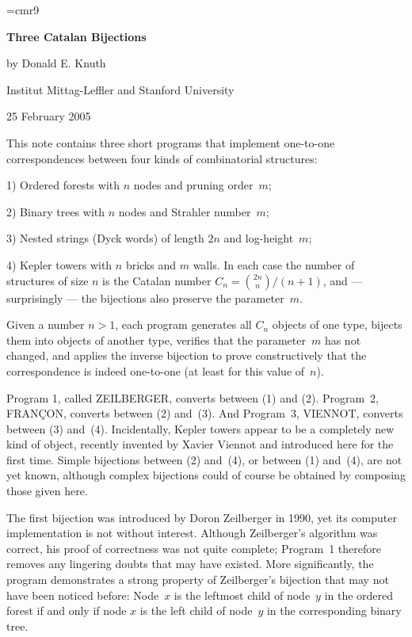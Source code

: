 
\font\mc=cmr9

\null\vfill
{}

\centerline{\bf Three Catalan Bijections}
\bigskip
\centerline{by Donald E. Knuth}
\smallskip
\centerline{Institut Mittag-Leffler and Stanford University}
\centerline{25 February 2005}
\bigskip
\bigskip
\noindent
This note contains three short programs that implement one-to-one
correspondences between four kinds of combinatorial structures:
\smallskip\item{1)} Ordered forests with $n$ nodes and pruning order~$m$;
\smallskip\item{2)} Binary trees with $n$ nodes and Strahler number~$m$;
\smallskip\item{3)} Nested strings (Dyck words) of length $2n$ and
log-height~$m$;
\smallskip\item{4)} Kepler towers with $n$ bricks and $m$ walls.
\smallskip\noindent
In each case the number of structures of size $n$ is the Catalan
number $C_n={2n\choose n}/(n+1)$, and --- surprisingly --- the
bijections also preserve the parameter~$m$.

Given a number $n>1$, each program generates all $C_n$ objects of
one type, bijects them into objects of another type, verifies that
the parameter~$m$ has not changed, and applies the inverse bijection
to prove constructively that the correspondence is indeed one-to-one
(at least for this value of~$n$).

Program 1, called {\mc ZEILBERGER}, converts between (1) and (2).
Program~2, {\mc FRAN\c{C}ON}, converts between (2) and~(3). And
Program~3, {\mc VIENNOT}, converts between (3) and~(4). Incidentally,
Kepler towers appear to be a completely new kind of object, recently
invented by Xavier Viennot and introduced here for the first time.
Simple bijections between (2) and~(4), or between (1) and~(4),
are not yet known, although complex bijections could of course
be obtained by composing those given here.

The first bijection was introduced by Doron Zeilberger in 1990, yet
its computer implementation is not without interest. Although
Zeilberger's algorithm was correct, his proof of correctness
was not quite complete; Program~1 therefore removes any lingering doubts
that may have existed. More significantly, the program demonstrates
a strong property of Zeilberger's bijection that may not have been
noticed before: Node~$x$ is the leftmost child of node~$y$ in the
ordered forest if and only if node $x$ is the left child of
node~$y$ in the corresponding binary tree.

